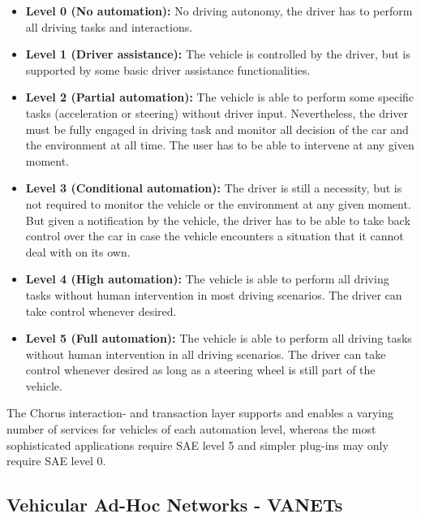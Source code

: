 \documentclass{llncs}
\begin{document}
{			\begin{itemize}
				\item \textbf{Level 0 (No automation): }No driving autonomy, the driver has to perform all driving tasks and interactions.
				\item \textbf{Level 1 (Driver assistance): }The vehicle is controlled by the driver, but is supported by some basic driver assistance functionalities.
				\item \textbf{Level 2 (Partial automation): }The vehicle is able to perform some specific tasks (acceleration or steering) without driver input. Nevertheless, the driver must be fully engaged in driving task and monitor all decision of the car and the environment at all time. The user has to be able to intervene at any given moment. 
				\item \textbf{Level 3 (Conditional automation): }The driver is still a necessity, but is not required to monitor the vehicle or the environment at any given moment. But given a notification by the vehicle, the driver has to be able to take back control over the car in case the vehicle encounters a situation that it cannot deal with on its own.
				\item \textbf{Level 4 (High automation): }The vehicle is able to perform all driving tasks without human intervention in most driving scenarios. The driver can take control whenever desired.
				\item \textbf{Level 5 (Full automation): }The vehicle is able to perform all driving tasks without human intervention in all driving scenarios. The driver can take control whenever desired as long as a steering wheel is still part of the vehicle.
			\end{itemize}
			
			The Chorus interaction- and transaction layer supports and enables a varying number of services for vehicles of each automation level, whereas the most sophisticated applications require SAE level 5 and simpler plug-ins may only require SAE level 0.

		
		\subsection{Vehicular Ad-Hoc Networks - VANETs}
			\label{ss:vanets}

}
\end{document}
